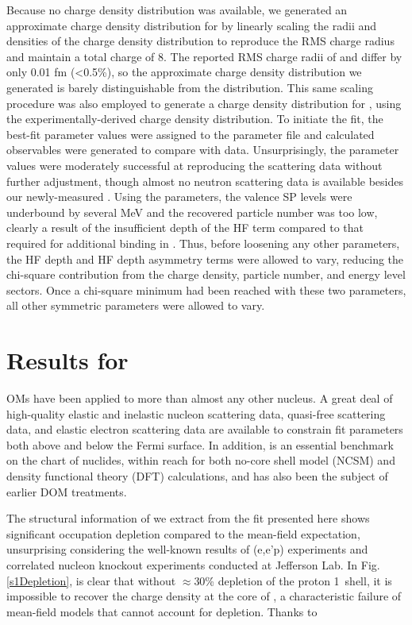 Because no \oEight charge density distribution was available, we generated an approximate charge density
distribution for \oEight by linearly scaling
the radii and densities of the \oSix charge density distribution to reproduce the \oEight RMS charge
radius and maintain a total charge of 8. The reported RMS charge radii of \oSix and \oEight differ by only
0.01 fm (<0.5\%), so the approximate \oEight charge density distribution we generated is barely
distinguishable from the \oSix distribution. This same scaling procedure was also employed to
generate a charge density distribution for \snTwelve, using the
experimentally-derived \snFour charge density distribution. To initiate the fit, the \oSix best-fit parameter values
were assigned to the \oEight parameter file and calculated observables were generated to compare
with \oEight data. Unsurprisingly, the \oSix parameter values were moderately successful at reproducing
the \oEight scattering data without further adjustment, though almost no neutron scattering data is
available besides our newly-measured \tot. Using the \oSix parameters, the \oEight valence SP levels were underbound
by several MeV and the recovered particle number was too low, clearly a result of the insufficient
depth of the \oSix HF term compared to that required for additional binding in \oEight. Thus, before
loosening any other parameters, the HF depth and HF depth asymmetry terms were allowed to vary,
reducing the chi-square contribution from the charge density, particle number, and energy level
sectors. Once a chi-square minimum had been reached with these two parameters, all other symmetric parameters
were allowed to vary.

\section{Results for \caForty}
OMs have been applied to \caForty more than almost any other nucleus. A great deal of high-quality
elastic and inelastic nucleon scattering data, quasi-free scattering data, and elastic electron
scattering data are available to constrain fit parameters both above and below the Fermi surface. In
addition, \caForty is an essential benchmark on the chart of nuclides, within reach for both no-core
shell model (NCSM) and density functional theory (DFT) calculations, and has also been the subject
of earlier DOM treatments.

The structural information of \caForty we extract from the fit
presented here shows significant occupation depletion compared to the mean-field expectation,
unsurprising considering the well-known results of (e,e'p) experiments and correlated nucleon knockout
experiments conducted at Jefferson Lab. In Fig. \ref{s1Depletion}, is clear that without $\approx$30\%
depletion of the proton 1\sOne\ shell, it is impossible to recover the charge density at the core of
\caForty, a characteristic failure of mean-field models that cannot account for depletion. Thanks to 

